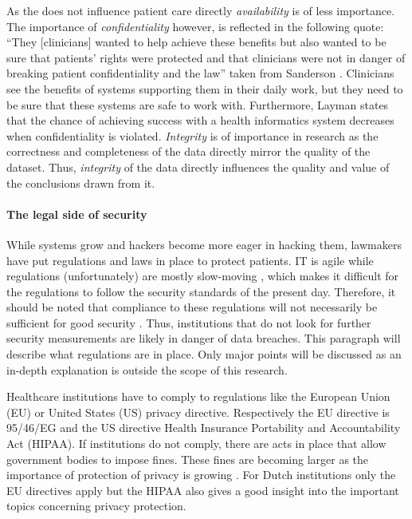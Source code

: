 As the \ivfsystem{} does not influence patient care directly \emph{availability} is of less importance.
The importance of \emph{confidentiality} however, is reflected in the following quote: ``They [clinicians] wanted to help achieve these benefits but also wanted to be sure that patients' rights were protected and that clinicians were not in danger of breaking patient confidentiality and the law'' taken from Sanderson \cite{s5Sanderson2004}.
Clinicians see the benefits of systems supporting them in their daily work, but they need to be sure that these systems are safe to work with.
Furthermore, Layman \cite{s4Layman2008} states that the chance of achieving success with a health informatics system decreases when confidentiality is violated.
\emph{Integrity} is of importance in research as the correctness and completeness of the data directly mirror the quality of the dataset.
Thus, \emph{integrity} of the data directly influences the quality and value of the conclusions drawn from it.

\paragraph{The legal side of security}
\label{security-legal}

While systems grow and hackers become more eager in hacking them, lawmakers have put regulations and laws in place to protect patients.
IT is agile while regulations (unfortunately) are mostly slow-moving \cite{s20Groves2013}, which makes it difficult for the regulations to follow the security standards of the present day.
Therefore, it should be noted that compliance to these regulations will not necessarily be sufficient for good security \cite{s20Groves2013}.
Thus, institutions that do not look for further security measurements are likely in danger of data breaches.
This paragraph will describe what regulations are in place. 
Only major points will be discussed as an in-depth explanation is outside the scope of this research.

Healthcare institutions have to comply to regulations like the European Union (EU) or United States (US) privacy directive.
Respectively the EU directive is 95/46/EG and the US directive Health Insurance Portability and Accountability Act (HIPAA).
If institutions do not comply, there are acts in place that allow government bodies to impose fines.
These fines are becoming larger as the importance of protection of privacy is growing \cite{s1Zamosky2014}.
For Dutch institutions only the EU directives apply but the HIPAA also gives a good insight into the important topics concerning privacy protection.

